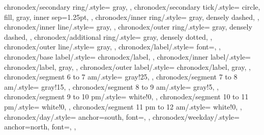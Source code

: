 {    chronodex/secondary ring/.style={
        gray,
    },
    chronodex/secondary tick/.style={
        circle,
        fill,
        gray,
        inner sep=1.25pt,
    },
    chronodex/inner ring/.style={
        gray,
        densely dashed,
    },
    chronodex/inner line/.style={
        gray,
    },
    chronodex/outer ring/.style={
        gray,
        densely dashed,
    },
    chronodex/additional ring/.style={
        gray,
        densely dotted,
    },
    chronodex/outer line/.style={
        gray,
    },
    chronodex/label/.style={
        font=\footnotesize,
    },
    chronodex/base label/.style={
        chronodex/label,
    },
    chronodex/inner label/.style={
        chronodex/label,
        gray,
    },
    chronodex/outer label/.style={
        chronodex/label,
        gray,
    },
    chronodex/segment 6 to 7 am/.style={
        gray!25,
    },
    chronodex/segment 7 to 8 am/.style={
        gray!15,
    },
    chronodex/segment 8 to 9 am/.style={
        gray!5,
    },
    chronodex/segment 9 to 10 pm/.style={
        white!0,
    },
    chronodex/segment 10 to 11 pm/.style={
        white!0,
    },
    chronodex/segment 11 pm to 12 am/.style={
        white!0,
    },
    chronodex/day/.style={
        anchor=south,
        font=\Huge,
    },
    chronodex/weekday/.style={
        anchor=north,
        font=\large,
    },
}